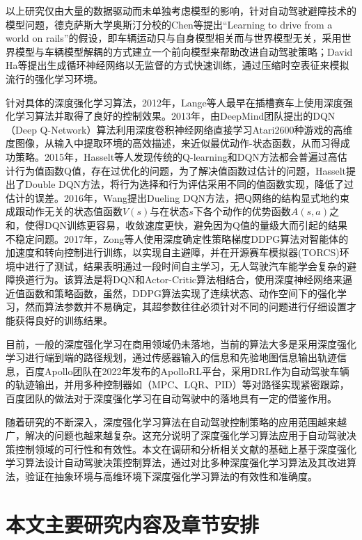 以上研究仅由大量的数据驱动而未单独考虑模型的影响，针对自动驾驶避障技术的模型问题，德克萨斯大学奥斯汀分校的Chen等提出“Learning to drive from a world on rails”的假设\cite{2021Learning}，即车辆运动只与自身模型相关而与世界模型无关，采用世界模型与车辆模型解耦的方式建立一个前向模型来帮助改进自动驾驶策略；David Ha等提出生成循环神经网络以无监督的方式快速训练，通过压缩时空表征来模拟流行的强化学习环境\cite{2018Recurrent}。

针对具体的深度强化学习算法，2012年，Lange等人最早在插槽赛车上使用深度强化学习算法并取得了良好的控制效果\cite{2012Autonomous}。2013年，由DeepMind团队提出的DQN（Deep Q-Network）算法利用深度卷积神经网络直接学习Atari2600种游戏的高维度图像，从输入中提取环境的高效描述，来近似最优动作-状态函数，从而习得成功策略\cite{2013DQN}。2015年，Hasselt等人发现传统的Q-learning和DQN方法都会普遍过高估计行为值函数Q值，存在过优化的问题，为了解决值函数过估计的问题，Hasselt提出了Double DQN方法，将行为选择和行为评估采用不同的值函数实现，降低了过估计的误差\cite{2015DDQN}。2016年，Wang提出Dueling DQN方法，把Q网络的结构显式地约束成跟动作无关的状态值函数$V(s)$与在状态$s$下各个动作的优势函数$A(s,a)$之和，使得DQN训练更容易，收敛速度更快，避免因为Q值的量级大而引起的结果不稳定问题\cite{2016DuelingDQN}。2017年，Zong等人使用深度确定性策略梯度DDPG算法对智能体的加速度和转向控制进行训练，以实现自主避障，并在开源赛车模拟器(TORCS)环境中进行了测试，结果表明通过一段时间自主学习，无人驾驶汽车能学会复杂的避障换道行为\cite{2017Obstacle}。该算法是将DQN和Actor-Critic算法相结合，使用深度神经网络来逼近值函数和策略函数，虽然，DDPG算法实现了连续状态、动作空间下的强化学习，然而算法参数并不易确定，其超参数往往必须针对不同的问题进行仔细设置才能获得良好的训练结果。

目前，一般的深度强化学习在商用领域仍未落地，当前的算法大多是采用深度强化学习进行端到端的路径规划，通过传感器输入的信息和先验地图信息输出轨迹信息，百度Apollo团队在2022年发布的ApolloRL平台\cite{2022ApolloRL}，采用DRL作为自动驾驶车辆的轨迹输出，并用多种控制器如（MPC、LQR、PID）等对路径实现紧密跟踪，百度团队的做法对于深度强化学习在自动驾驶中的落地具有一定的借鉴作用。

随着研究的不断深入，深度强化学习算法在自动驾驶控制策略的应用范围越来越广，解决的问题也越来越复杂。这充分说明了深度强化学习算法应用于自动驾驶决策控制领域的可行性和有效性。本文在调研和分析相关文献的基础上基于深度强化学习算法设计自动驾驶决策控制算法，通过对比多种深度强化学习算法及其改进算法，验证在抽象环境与高维环境下深度强化学习算法的有效性和准确度。

\section{本文主要研究内容及章节安排} %


